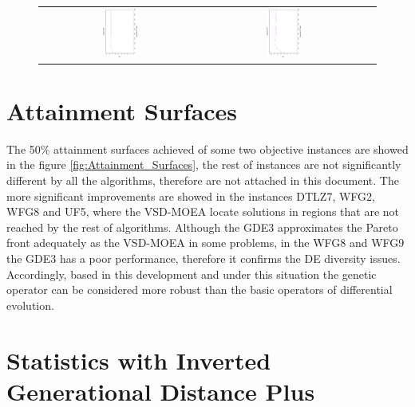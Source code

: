 \begin{figure}[t]
\begin{tabular}{ccc}
\includegraphics[width=0.22\textwidth, angle=-90,origin=c]{Tuning/UF8.eps} &
\includegraphics[width=0.22\textwidth, angle=-90,origin=c]{Tuning/UF10.eps} 
\end{tabular}
\end{figure}



\section{Attainment Surfaces}

The 50\% attainment surfaces achieved of some two objective instances are showed in the figure \ref{fig:Attainment_Surfaces}, the rest of instances are not significantly different by all the algorithms, therefore are not attached in this document.
%
The more significant improvements are showed in the instances DTLZ7, WFG2, WFG8 and UF5, where the VSD-MOEA locate solutions in regions that are not reached by the rest of algorithms.
%
Although the GDE3 approximates the Pareto front adequately as the VSD-MOEA in some problems, in the WFG8 and WFG9 the GDE3 has a poor performance, therefore it confirms the DE diversity issues.
%
Accordingly, based in this development and under this situation the genetic operator can be considered more robust than the basic operators of differential evolution.



\section{Statistics with Inverted Generational Distance Plus}

